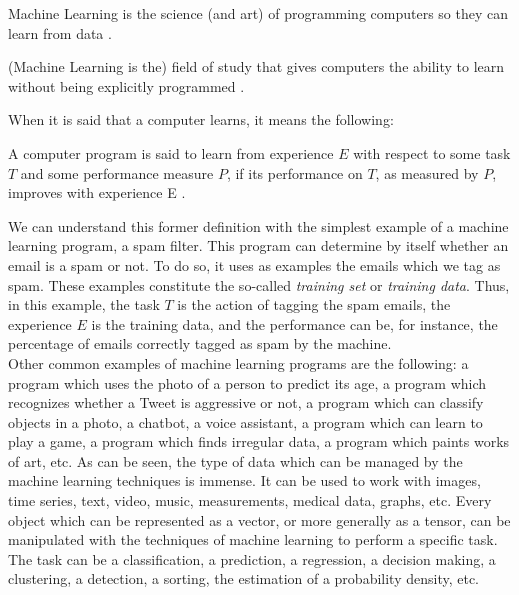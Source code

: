 \begin{defn}
Machine Learning is the science (and art) of programming computers so they can learn from data \cite{machine_hands_on}.
\end{defn}

\begin{defn}
(Machine Learning is the) field of study that gives computers the ability to learn without being explicitly programmed \cite{machine_samuel}.
\end{defn}

When it is said that a computer learns, it means the following:
 
\begin{defn}
\label{learn_definition}
A computer program is said to learn from experience $E$ with respect to some task $T$ and some performance measure $P$, if its performance on $T$, as measured by $P$, improves with experience E \cite{machine_mitchell}.
\end{defn}

We can understand this former definition with the simplest example of a machine learning program, a spam filter. This program can determine by itself whether an email is a spam or not. To do so, it uses as examples the emails which we tag as spam. These examples constitute the so-called \textit{training set} or \textit{training data}. Thus, in this example, the task $T$ is the action of tagging the spam emails, the experience $E$ is the training data, and the performance can be, for instance, the percentage of emails correctly tagged as spam by the machine.\\

Other common examples of machine learning programs are the following: a program which uses the photo of a person to predict its age, a program which recognizes whether a Tweet is aggressive or not, a program which can classify objects in a photo, a chatbot, a voice assistant, a program which can learn to play a game, a program which finds irregular data, a program which paints works of art, etc. As can be seen, the type of data which can be managed by the machine learning techniques is immense. It can be used to work with images, time series, text, video, music, measurements, medical data, graphs, etc. Every object which can be represented as a vector, or more generally as a tensor, can be manipulated with the techniques of machine learning to perform a specific task. The task can be a classification, a prediction, a regression, a decision making, a clustering, a detection, a sorting, the estimation of a probability density, etc.\\

